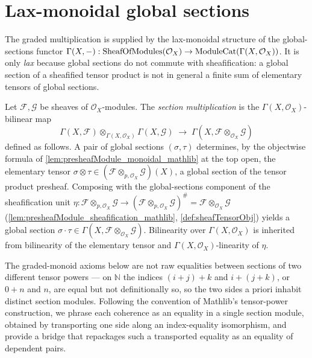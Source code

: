 \section{Lax-monoidal global sections}
\label{sec:sgr_lax_sections}

The graded multiplication is supplied by the lax-monoidal structure of the
global-sections functor \(\Gamma(X, -) : \mathrm{SheafOfModules}(\mathcal{O}_X) \to
\mathrm{ModuleCat}(\Gamma(X, \mathcal{O}_X))\). It is only \emph{lax} because
global sections do not commute with sheafification: a global section of a
sheafified tensor product is not in general a finite sum of elementary tensors of
global sections.

\begin{definition}
  \label{def:sectionMul}
  Let \(\mathcal{F}, \mathcal{G}\) be sheaves of \(\mathcal{O}_X\)-modules. The
  \emph{section multiplication} is the \(\Gamma(X,\mathcal{O}_X)\)-bilinear map
  \[
    \Gamma(X, \mathcal{F}) \otimes_{\Gamma(X,\mathcal{O}_X)}
      \Gamma(X, \mathcal{G})
    \;\longrightarrow\;
    \Gamma(X, \mathcal{F} \otimes_{\mathcal{O}_X} \mathcal{G})
  \]
  defined as follows. A pair of global sections \((\sigma, \tau)\) determines,
  by the objectwise formula of \cref{lem:presheafModule_monoidal_mathlib} at the
  top open, the elementary tensor \(\sigma \otimes \tau \in
  (\mathcal{F} \otimes_{p,\mathcal{O}_X} \mathcal{G})(X)\), a global section of
  the tensor product presheaf. Composing with the global-sections component of
  the sheafification unit
  \(\eta : \mathcal{F} \otimes_{p,\mathcal{O}_X} \mathcal{G} \to
  (\mathcal{F} \otimes_{p,\mathcal{O}_X} \mathcal{G})^{\#} =
  \mathcal{F} \otimes_{\mathcal{O}_X} \mathcal{G}\)
  (\cref{lem:presheafModule_sheafification_mathlib},
  \cref{def:sheafTensorObj}) yields a global section
  \(\sigma \cdot \tau \in
  \Gamma(X, \mathcal{F} \otimes_{\mathcal{O}_X} \mathcal{G})\). Bilinearity over
  \(\Gamma(X,\mathcal{O}_X)\) is inherited from bilinearity of the elementary
  tensor and \(\Gamma(X,\mathcal{O}_X)\)-linearity of \(\eta\).
\end{definition}

The graded-monoid axioms below are not raw equalities between sections of two
different tensor powers --- on \(\mathbb{N}\) the indices \((i+j)+k\) and
\(i+(j+k)\), or \(0+n\) and \(n\), are equal but not definitionally so, so the two
sides a priori inhabit distinct section modules. Following the convention of Mathlib's tensor-power construction, we phrase each coherence as an
equality in a single section module, obtained by transporting one side
along an index-equality isomorphism, and provide a bridge that repackages such a
transported equality as an equality of dependent pairs.

